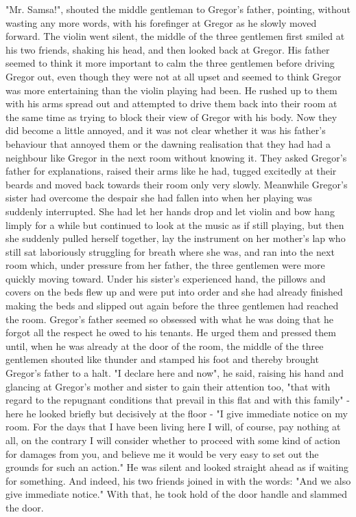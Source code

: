 "Mr. Samsa!", shouted the middle gentleman to Gregor's father, pointing, without wasting any more words, with his forefinger at Gregor as he slowly moved forward. The violin went silent, the middle of the three gentlemen first smiled at his two friends, shaking his head, and then looked back at Gregor. His father seemed to think it more important to calm the three gentlemen before driving Gregor out, even though they were not at all upset and seemed to think Gregor was more entertaining than the violin playing had been. He rushed up to them with his arms spread out and attempted to drive them back into their room at the same time as trying to block their view of Gregor with his body. Now they did become a little annoyed, and it was not clear whether it was his father's behaviour that annoyed them or the dawning realisation that they had had a neighbour like Gregor in the next room without knowing it. They asked Gregor's father for explanations, raised their arms like he had, tugged excitedly at their beards and moved back towards their room only very slowly. Meanwhile Gregor's sister had overcome the despair she had fallen into when her playing was suddenly interrupted. She had let her hands drop and let violin and bow hang limply for a while but continued to look at the music as if still playing, but then she suddenly pulled herself together, lay the instrument on her mother's lap who still sat laboriously struggling for breath where she was, and ran into the next room which, under pressure from her father, the three gentlemen were more quickly moving toward. Under his sister's experienced hand, the pillows and covers on the beds flew up and were put into order and she had already finished making the beds and slipped out again before the three gentlemen had reached the room. Gregor's father seemed so obsessed with what he was doing that he forgot all the respect he owed to his tenants. He urged them and pressed them until, when he was already at the door of the room, the middle of the three gentlemen shouted like thunder and stamped his foot and thereby brought Gregor's father to a halt. "I declare here and now", he said, raising his hand and glancing at Gregor's mother and sister to gain their attention too, "that with regard to the repugnant conditions that prevail in this flat and with this family" - here he looked briefly but decisively at the floor - "I give immediate notice on my room. For the days that I have been living here I will, of course, pay nothing at all, on the contrary I will consider whether to proceed with some kind of action for damages from you, and believe me it would be very easy to set out the grounds for such an action." He was silent and looked straight ahead as if waiting for something. And indeed, his two friends joined in with the words: "And we also give immediate notice." With that, he took hold of the door handle and slammed the door.


